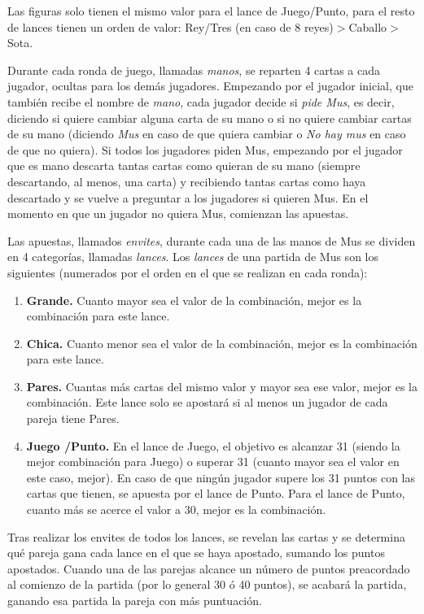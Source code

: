 Las figuras solo tienen el mismo valor para el lance de Juego/Punto, para el resto de lances tienen un orden de valor: Rey/Tres (en caso de 8 reyes)$>$Caballo$>$Sota.

Durante cada ronda de juego, llamadas \textit{manos}, se reparten 4 cartas a cada jugador, ocultas para los demás jugadores. Empezando por el jugador inicial, que también recibe el nombre de \textit{mano}, cada jugador decide si \textit{pide Mus}, es decir, diciendo si quiere cambiar alguna carta de su mano o si no quiere cambiar cartas de su mano (diciendo \textit{Mus} en caso de que quiera cambiar o  \textit{No hay mus} en caso de que no quiera). Si todos los jugadores piden Mus, empezando por el jugador que es mano descarta tantas cartas como quieran de su mano (siempre descartando, al menos, una carta) y recibiendo tantas cartas como haya descartado y se vuelve a preguntar a los jugadores si quieren Mus. En el momento en que un jugador no quiera Mus, comienzan las apuestas. \cite{mus}

Las apuestas, llamados \textit{envites}, durante cada una de las manos de Mus se dividen en 4 categorías, llamadas \textit{lances}. Los \textit{lances} de una partida de Mus son los siguientes (numerados por el orden en el que se realizan en cada ronda):
\begin{enumerate}
\item \textbf{Grande.} Cuanto mayor sea el valor de la combinación, mejor es la combinación para este lance. 
\item \textbf{Chica.} Cuanto menor sea el valor de la combinación, mejor es la combinación para este lance.
\item \textbf{Pares.} Cuantas más cartas del mismo valor y mayor sea ese valor, mejor es la combinación. Este lance solo se apostará si al menos un jugador de cada pareja tiene Pares.
\item \textbf{Juego /Punto.} En el lance de Juego, el objetivo es alcanzar 31 (siendo la mejor combinación para Juego) o superar 31 (cuanto mayor sea el valor en este caso, mejor). En caso de que ningún jugador supere los 31 puntos con las cartas que tienen, se apuesta por el lance de Punto. Para el lance de Punto, cuanto más se acerce el valor a 30, mejor es la combinación.
\end{enumerate}

Tras realizar los envites de todos los lances, se revelan las cartas y se determina qué pareja gana cada lance en el que se haya apostado, sumando los puntos apostados. Cuando una de las parejas alcance un número de puntos preacordado al comienzo de la partida (por lo general 30 ó 40 puntos), se acabará la partida, ganando esa partida la pareja con más puntuación.

